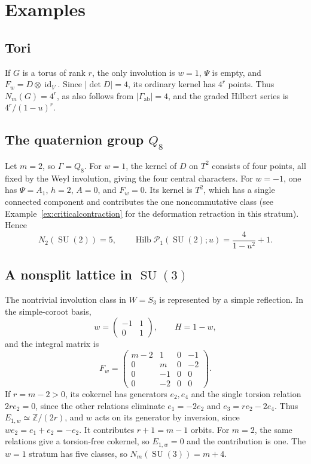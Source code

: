\documentclass[11pt,a4paper,reqno]{amsart}
\theoremstyle{plain}
\theoremstyle{definition}
\theoremstyle{remark}
\numberwithin{equation}{section}
\newcommand{\SU}{\operatorname{SU}}
\newcommand{\ZZ}{\mathbb Z}
\newcommand{\cP}{\mathcal P}
\DeclareMathOperator{\id}{id}
\begin{document}
\section{Examples}\label{sec:examples}

\subsection{Tori}

If $G$ is a torus of rank $r$, the only involution is $w=1$, $\Psi$ is empty, and $F_w=D\otimes\id_V$. Since $|\det D|=4$, its ordinary kernel has $4^r$ points. Thus $N_m(G)=4^r$, as also follows from $|\Gamma_{\mathrm{ab}}|=4$, and the graded Hilbert series is $4^r/(1-u)^r$.

\subsection{The quaternion group \texorpdfstring{$Q_8$}{Q8}}

Let $m=2$, so $\Gamma=Q_8$. For $w=1$, the kernel of $D$ on $T^2$ consists of four points, all fixed by the Weyl involution, giving the four central characters. For $w=-1$, one has $\Psi=A_1$, $h=2$, $A=0$, and $F_w=0$. Its kernel is $T^2$, which has a single connected component and contributes the one noncommutative class (see Example~\ref{ex:criticalcontraction} for the deformation retraction in this stratum). Hence
\[
N_2(\SU(2))=5,\qquad \operatorname{Hilb}\cP_1(\SU(2);u)=\frac4{1-u^2}+1.
\]

\subsection{A nonsplit lattice in \texorpdfstring{$\SU(3)$}{SU(3)}}

The nontrivial involution class in $W=S_3$ is represented by a simple reflection. In the simple-coroot basis,
\[
w=\begin{pmatrix}-1&1\\0&1\end{pmatrix},\qquad H=1-w,
\]
and the integral matrix is
\[
F_w=\begin{pmatrix}
m-2&1&0&-1\\
0&m&0&-2\\
0&-1&0&0\\
0&-2&0&0
\end{pmatrix}.
\]
If $r=m-2>0$, its cokernel has generators $e_2,e_4$ and the single torsion relation $2r e_2=0$, since the other relations eliminate $e_1=-2e_2$ and $e_3=r e_2-2e_4$. Thus $E_{1,w}\simeq\ZZ/(2r)$, and $w$ acts on its generator by inversion, since $we_2=e_1+e_2=-e_2$. It contributes $r+1=m-1$ orbits. For $m=2$, the same relations give a torsion-free cokernel, so $E_{1,w}=0$ and the contribution is one. The $w=1$ stratum has five classes, so $N_m(\SU(3))=m+4$.
\end{document}
